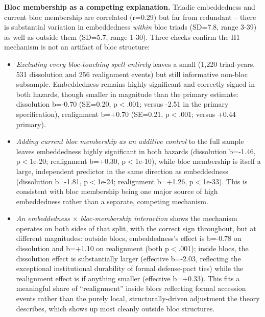 \documentclass[Afour,sageh,times,doublespace]{sagej}
\begin{document}
\textbf{Bloc membership as a competing explanation.} Triadic embeddedness and current bloc membership are correlated (r=0.29) but far from redundant -- there is substantial variation in embeddedness \emph{within} bloc triads (SD=7.8, range 3-39) as well as outside them (SD=5.7, range 1-30). Three checks confirm the H1 mechanism is not an artifact of bloc structure:

\begin{itemize}
\item \emph{Excluding every bloc-touching spell entirely} leaves a small (1,220 triad-years, 531 dissolution and 256 realignment events) but still informative non-bloc subsample. Embeddedness remains highly significant and correctly signed in both hazards, though smaller in magnitude than the primary estimate: dissolution b=-0.70 (SE=0.20, p$<$.001; versus -2.51 in the primary specification), realignment b=+0.70 (SE=0.21, p$<$.001; versus +0.44 primary).
\item \emph{Adding current bloc membership as an additive control} to the full sample leaves embeddedness highly significant in both hazards (dissolution b=-1.46, p$<$1e-20; realignment b=+0.30, p$<$1e-10), while bloc membership is itself a large, independent predictor in the same direction as embeddedness (dissolution b=-1.81, p$<$1e-24; realignment b=+1.26, p$<$1e-33). This is consistent with bloc membership being one major source of high embeddedness rather than a separate, competing mechanism.
\item \emph{An embeddedness $\times$ bloc-membership interaction} shows the mechanism operates on both sides of that split, with the correct sign throughout, but at different magnitudes: outside blocs, embeddedness's effect is b=-0.78 on dissolution and b=+1.10 on realignment (both p$<$.001); inside blocs, the dissolution effect is substantially larger (effective b=-2.03, reflecting the exceptional institutional durability of formal defense-pact ties) while the realignment effect is if anything smaller (effective b=+0.33). This fits a meaningful share of ``realignment'' inside blocs reflecting formal accession events rather than the purely local, structurally-driven adjustment the theory describes, which shows up most cleanly outside bloc structures.
\end{itemize}
\end{document}
